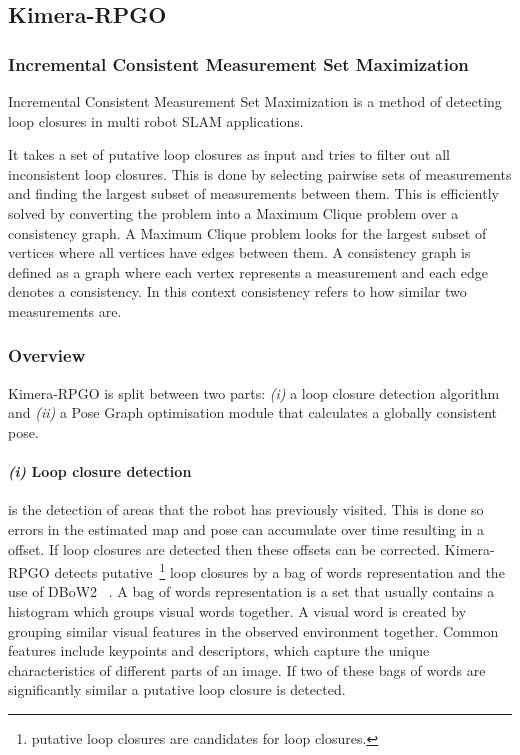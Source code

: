 \documentclass[11pt,a4paper]{article}
\begin{document}
\subsection{Kimera-RPGO}

\subsubsection{Incremental Consistent Measurement Set Maximization} \label{pre:PCM}
Incremental Consistent Measurement Set Maximization is a  method of detecting loop closures in multi robot SLAM applications. 

It takes a set of putative loop closures as input and tries to filter out all inconsistent loop closures. 
This is done by selecting pairwise sets of measurements and finding the largest subset of measurements between them.
This is efficiently solved by converting the problem into a Maximum Clique problem over a consistency graph. 
A Maximum Clique problem looks for the largest subset of vertices where all vertices have edges between them. 
A consistency graph is defined as a graph where each vertex represents a measurement and each edge denotes a consistency.
In this context consistency refers to how similar two measurements are.
\subsubsection {Overview}
Kimera-RPGO is split between two parts: \textit{(i)} a loop closure detection algorithm and \textit{(ii)} a Pose Graph optimisation module that calculates a globally consistent pose.

\paragraph{\textit{(i)} Loop closure detection}
is the detection of areas that the robot has previously visited.
This is done so errors in the estimated map and pose can accumulate over time resulting in a offset.
If loop closures are detected then these offsets can be corrected. 
Kimera-RPGO detects putative~\footnote{putative loop closures are candidates for loop closures.} loop closures by a bag of words representation and the use of DBoW2~\cite{dbow2} . 
A bag of words representation is a set that usually contains a histogram which groups visual words together. 
A visual word is created by grouping similar visual features in the observed environment together.
Common features include keypoints and descriptors, which capture the unique characteristics of different parts of an image. 
If two of these bags of words are significantly similar a putative loop closure is detected. 
\end{document}
